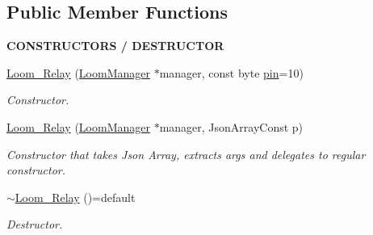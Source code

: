 \subsection*{Public Member Functions}
\begin{Indent}{\bf C\+O\+N\+S\+T\+R\+U\+C\+T\+O\+RS / D\+E\+S\+T\+R\+U\+C\+T\+OR}\par
\begin{DoxyCompactItemize}
\item 
\hyperlink{class_loom___relay_a48ea7618746875d47a9d00ce797dc2f5}{Loom\+\_\+\+Relay} (\hyperlink{class_loom_manager}{Loom\+Manager} $\ast$manager, const byte \hyperlink{class_loom___relay_ad3cc1e820888c8bbf632dc03036d6a84}{pin}=10)
\begin{DoxyCompactList}\small\item\em Constructor. \end{DoxyCompactList}\item 
\hyperlink{class_loom___relay_a65ee0e34faf507487c9e02dfba5fd043}{Loom\+\_\+\+Relay} (\hyperlink{class_loom_manager}{Loom\+Manager} $\ast$manager, Json\+Array\+Const p)
\begin{DoxyCompactList}\small\item\em Constructor that takes Json Array, extracts args and delegates to regular constructor. \end{DoxyCompactList}\item 
\hyperlink{class_loom___relay_a59394cb27c87169a6de0dd726f7b49eb}{$\sim$\+Loom\+\_\+\+Relay} ()=default
\begin{DoxyCompactList}\small\item\em Destructor. \end{DoxyCompactList}\end{DoxyCompactItemize}
\end{Indent}

